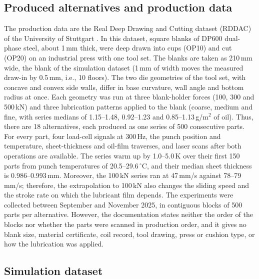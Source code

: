 \documentclass[pdflatex,sn-basic,lineno]{sn-jnl}
\begin{document}
\subsection{Produced alternatives and production data}\label{sec:data}

The production data are the Real Deep Drawing and Cutting dataset (RDDAC) of the University of Stuttgart \citep{baum2026rddac, baum2026statistical}. In this dataset, square blanks of DP600 dual-phase steel, about 1\,mm thick, were deep drawn into cups (OP10) and cut (OP20) on an industrial press with one tool set. The blanks are taken as 210\,mm wide, the blank of the simulation dataset (1\,mm of width moves the measured draw-in by 0.5\,mm, i.e., 10 floors). The two die geometries of the tool set, with concave and convex side walls, differ in base curvature, wall angle and bottom radius at once. Each geometry was run at three blank-holder forces (100, 300 and 500\,kN) and three lubrication patterns applied to the blank (coarse, medium and fine, with series medians of 1.15--1.48, 0.92--1.23 and 0.85--1.13\,g/m$^2$ of oil). Thus, there are 18 alternatives, each produced as one series of 500 consecutive parts. For every part, four load-cell signals at 300\,Hz, the punch position and temperature, sheet-thickness and oil-film traverses, and laser scans after both operations are available. The series warm up by 1.0--5.0\,K over their first 150 parts from punch temperatures of 20.5--29.6\,$^\circ$C, and their median sheet thickness is 0.986--0.993\,mm. Moreover, the 100\,kN series ran at 47\,mm/s against 78--79\,mm/s; therefore, the extrapolation to 100\,kN also changes the sliding speed and the stroke rate on which the lubricant film depends. The experiments were collected between September and November 2025, in contiguous blocks of 500 parts per alternative. However, the documentation states neither the order of the blocks nor whether the parts were scanned in production order, and it gives no blank size, material certificate, coil record, tool drawing, press or cushion type, or how the lubrication was applied.

\subsection{Simulation dataset}\label{sec:sims}
\end{document}
